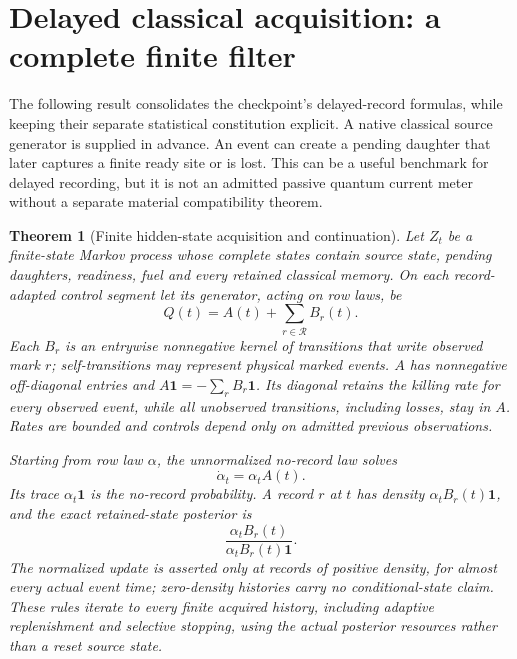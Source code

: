 \documentclass[11pt,oneside,openany]{book}
\newtheorem{theorem}{Theorem}[chapter]
\theoremstyle{definition}
\theoremstyle{remark}\newtheorem{remark}[theorem]{Remark}
\begin{document}
\section{Delayed classical acquisition: a complete finite filter}

The following result consolidates the checkpoint's delayed-record
formulas, while keeping their separate statistical constitution
explicit. A native classical source generator is supplied in advance.
An event can create a pending daughter that later captures a finite
ready site or is lost. This can be a useful benchmark for delayed
recording, but it is not an admitted passive quantum current meter
without a separate material compatibility theorem.

\begin{theorem}[Finite hidden-state acquisition and continuation]
\label{det:delayed-filter}
Let $Z_t$ be a finite-state Markov process whose complete states contain
source state, pending daughters, readiness, fuel and every retained
classical memory. On each record-adapted control segment let its
generator, acting on row laws, be
\begin{equation}
 Q(t)=A(t)+\sum_{r\in\mathcal R}B_r(t).          \label{det:filter-generator}
\end{equation}
Each $B_r$ is an entrywise nonnegative kernel of transitions that
write observed mark $r$; self-transitions may represent physical
marked events. $A$ has nonnegative off-diagonal entries and
$A\mathbf1=-\sum_rB_r\mathbf1$. Its diagonal retains the killing
rate for every observed event, while all unobserved transitions,
including losses, stay in $A$. Rates are bounded and controls depend
only on admitted previous observations.

Starting from row law $\alpha$, the unnormalized no-record law solves
\begin{equation}
 \dot\alpha_t=\alpha_tA(t).                    \label{det:filter-no-event}
\end{equation}
Its trace $\alpha_t\mathbf1$ is the no-record probability. A record
$r$ at $t$ has density $\alpha_tB_r(t)\mathbf1$, and the exact
retained-state posterior is
\begin{equation}
 \frac{\alpha_tB_r(t)}{\alpha_tB_r(t)\mathbf1}.               \label{det:filter-update}
\end{equation}
The normalized update is asserted only at records of positive density,
for almost every actual event time; zero-density histories carry no
conditional-state claim. These rules iterate to every finite acquired
history, including adaptive replenishment and selective stopping, using
the actual posterior resources rather than a reset source state.
\end{theorem}
\end{document}
